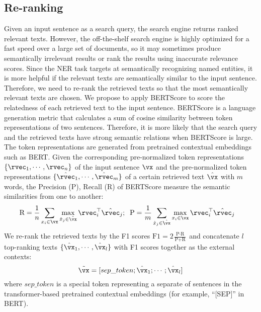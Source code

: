 \subsection{Re-ranking}
Given an input sentence as a search query, the search engine returns ranked relevant texts. %
However, the off-the-shelf search engine is highly optimized for a fast speed over a large set of documents, so it may sometimes produce semantically irrelevant results or rank the results using inaccurate relevance scores.
Since the NER task targets at semantically recognizing named entities, it is more helpful if the relevant texts are semantically similar to the input sentence. Therefore, we need to re-rank the retrieved texts so that the most semantically relevant texts are chosen. We propose to apply BERTScore \citep{Zhang*2020BERTScore:} to score the relatedness of each retrieved text to the input sentence. BERTScore is a language generation metric that calculates a sum of cosine similarity between token representations of two sentences. Therefore, it is more likely that the search query and the retrieved texts have strong semantic relations when BERTScore is large. The token representations are generated from pretrained contextual embeddings such as BERT. Given the corresponding pre-normalized token representations $\{\rvec_1, \cdots, \rvec_n\}$ of the input sentence $\vx$ and the pre-normalized token representations $\{\hat{\rvec}_1, \cdots, \hat{\rvec}_m\}$ of a certain retrieved text $\hat{\vx}$ with $m$ words, the Precision (P), Recall (R) of BERTScore measure the semantic similarities from one to another:
\begin{align*} %
    &\text{R} =\frac{1}{n} \sum_{x_i \in \vx}   \max_{\hat{x}_j \in \hat{\vx}} \rvec_i^\top \hat{\rvec}_{j};\;\;
    \text{P} = \frac{1}{m}  \sum_{\hat{x}_j\in \hat{\vx}}   \max_{x_i\in \vx}  \rvec_{i}^\top \hat{\rvec}_{j}
\end{align*}
 We re-rank the retrieved texts by the F1 scores $\text{F1}{=} 2\frac{\text{P} \cdot \text{R} }{\text{P} + \text{R} }$ and concatenate $l$ top-ranking texts $\{\hat{\vx}_1, \cdots, \hat{\vx}_l\}$ with F1 scores together as the external contexts:
\begin{displaymath}
\tilde{\vx} = [sep\_token; \hat{\vx}_1; \cdots; \hat{\vx}_l]
\end{displaymath} 
where $sep\_token$ is a special token representing a separate of sentences in the transformer-based pretrained contextual embeddings (for example, ``[SEP]'' in BERT).

